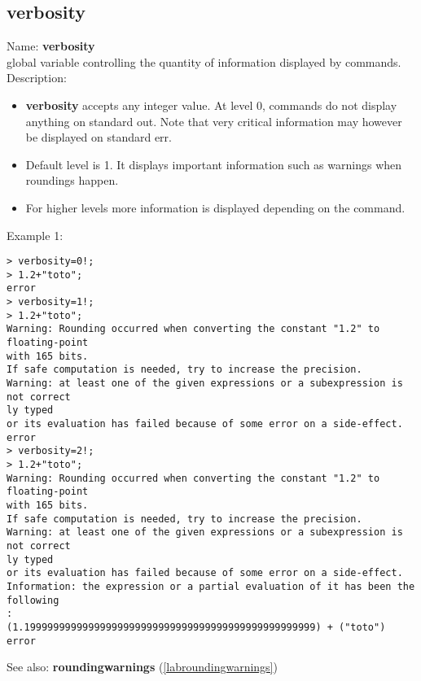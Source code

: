 \subsection{verbosity}
\label{labverbosity}
\noindent Name: \textbf{verbosity}\\
global variable controlling the quantity of information displayed by commands.\\
\noindent Description: \begin{itemize}

\item \textbf{verbosity} accepts any integer value. At level 0, commands do not display anything
   on standard out. Note that very critical information may however be displayed on
   standard err.

\item Default level is 1. It displays important information such as warnings when 
   roundings happen.

\item For higher levels more information is displayed depending on the command.
\end{itemize}
\noindent Example 1: 
\begin{center}\begin{minipage}{15cm}\begin{Verbatim}[frame=single]
> verbosity=0!;
> 1.2+"toto";
error
> verbosity=1!;
> 1.2+"toto";
Warning: Rounding occurred when converting the constant "1.2" to floating-point 
with 165 bits.
If safe computation is needed, try to increase the precision.
Warning: at least one of the given expressions or a subexpression is not correct
ly typed
or its evaluation has failed because of some error on a side-effect.
error
> verbosity=2!;
> 1.2+"toto";
Warning: Rounding occurred when converting the constant "1.2" to floating-point 
with 165 bits.
If safe computation is needed, try to increase the precision.
Warning: at least one of the given expressions or a subexpression is not correct
ly typed
or its evaluation has failed because of some error on a side-effect.
Information: the expression or a partial evaluation of it has been the following
:
(1.19999999999999999999999999999999999999999999999999) + ("toto")
error
\end{Verbatim}
\end{minipage}\end{center}
See also: \textbf{roundingwarnings} (\ref{labroundingwarnings})
